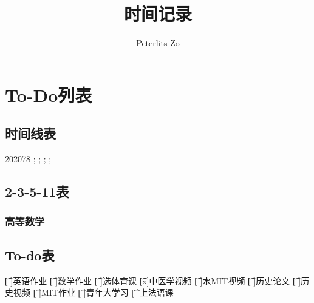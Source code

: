 \documentclass{peterlitsdoc}
\title{时间记录}
\author{Peterlits Zo}
\begin{document}
\maketitle
\tableofcontents
\newpage


\section{To-Do列表}

\subsection{时间线表}

\begin{plttimeline}{2020}{7}{8}
    ;
    ;
    ;
    ;
\end{plttimeline}

\subsection{2-3-5-11表}

\subsubsection{高等数学}



\subsection{To-do表}

\begin{plttodoenv}{4}
\t[ ]英语作业       \t[ ]数学作业       \t[ ]选体育课       \t[x]中医学视频
\t[ ]水MIT视频      \t[ ]历史论文       \t[ ]历史视频
\t[ ]MIT作业        \t[ ]青年大学习                         \t[ ]上法语课
\end{plttodoenv}



\end{document}
